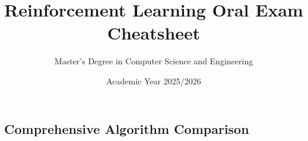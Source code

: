 \documentclass[11pt]{article}
\title{\textbf{Reinforcement Learning Oral Exam Cheatsheet}}
\author{Master's Degree in Computer Science and Engineering}
\date{Academic Year 2025/2026}
\begin{document}
\maketitle

\tableofcontents
\newpage


\newpage

\newpage

\newpage

\newpage

\newpage

\newpage

\newpage

\newpage


\newpage
\begin{landscape}
\section{Comprehensive Algorithm Comparison}


\end{landscape}
\end{document}

